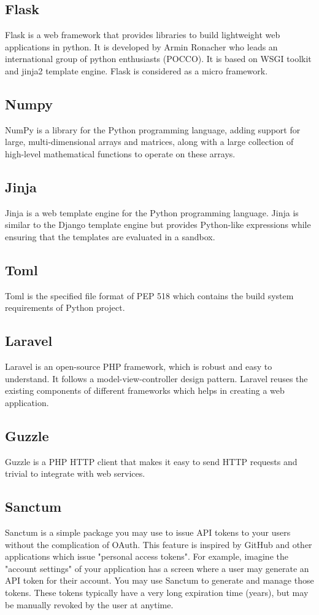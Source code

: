 \subsection{Flask}
Flask is a web framework that provides libraries to build lightweight web applications in python. It is developed by Armin Ronacher who leads an international group of python enthusiasts (POCCO). It is based on WSGI toolkit and jinja2 template engine. Flask is considered as a micro framework.
\subsection{Numpy}
NumPy is a library for the Python programming language, adding support for large, multi-dimensional arrays and matrices, along with a large collection of high-level mathematical functions to operate on these arrays.
\subsection{Jinja}
Jinja is a web template engine for the Python programming language. Jinja is similar to the Django template engine but provides Python-like expressions while ensuring that the templates are evaluated in a sandbox.
\subsection{Toml}
Toml is the specified file format of PEP 518 which contains the build system requirements of Python project.
\subsection{Laravel}
Laravel is an open-source PHP framework, which is robust and easy to understand. It follows a model-view-controller design pattern. Laravel reuses the existing components of different frameworks which helps in creating a web application.
\subsection{Guzzle}
Guzzle is a PHP HTTP client that makes it easy to send HTTP requests and trivial to integrate with web services.
\subsection{Sanctum}
Sanctum is a simple package you may use to issue API tokens to your users without the complication of OAuth. This feature is inspired by GitHub and other applications which issue "personal access tokens". For example, imagine the "account settings" of your application has a screen where a user may generate an API token for their account. You may use Sanctum to generate and manage those tokens. These tokens typically have a very long expiration time (years), but may be manually revoked by the user at anytime.
